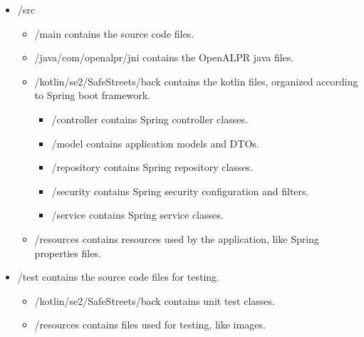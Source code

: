 \begin{itemize}
    \item 
    /src
    \begin{itemize}[label={$\diamond$}]
        \item 
        /main \textcolor{black!70}{contains the source code files.}
        \item 
        /java/com/openalpr/jni \textcolor{black!70}{contains the OpenALPR java files.}
        \item 
        /kotlin/se2/SafeStreets/back \textcolor{black!70}{contains the kotlin files, organized according to Spring boot framework.}
        \begin{itemize}[label={\textbf{-}}]
            \item 
            /controller \textcolor{black!70}{contains Spring controller classes.}
            \item 
            /model \textcolor{black!70}{contains application models and DTOs.}
            \item 
            /repository \textcolor{black!70}{contains Spring repository classes.}
            \item 
            /security \textcolor{black!70}{contains Spring security configuration and filters.}
            \item 
            /service \textcolor{black!70}{contains Spring service classes.}
        \end{itemize}
        \item 
        /resources \textcolor{black!70}{contains resources used by the application, like Spring properties files.}
    \end{itemize}

    \item 
    /test \textcolor{black!70}{contains the source code files for testing.}
    \begin{itemize}[label={$\diamond$}]
        \item 
        /kotlin/se2/SafeStreets/back \textcolor{black!70}{contains unit test classes.}
        \item 
        /resources \textcolor{black!70}{contains files used for testing, like images.}
    \end{itemize}
\end{itemize}

